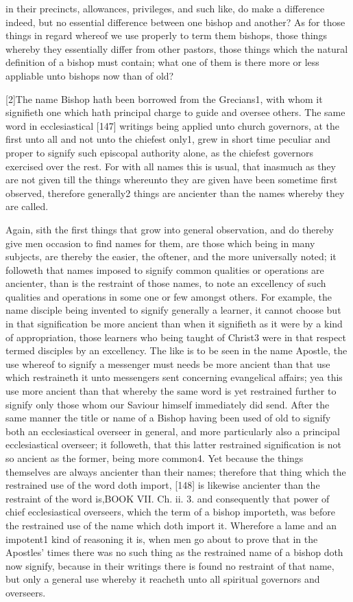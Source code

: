 in their precincts, allowances, privileges, and such like, do make a difference indeed, but no essential difference between one bishop and another? As for those things in regard whereof we use properly to term them bishops, those things whereby they essentially differ from other pastors, those things which the natural definition of a bishop must contain; what one of them is there more or less appliable unto bishops now than of old?

[2]The name Bishop hath been borrowed from the Grecians1, with whom it signifieth one which hath principal charge to guide and oversee others. The same word in ecclesiastical [147] writings being applied unto church governors, at the first unto all and not unto the chiefest only1, grew in short time peculiar and proper to signify such episcopal authority alone, as the chiefest governors exercised over the rest. For with all names this is usual, that inasmuch as they are not given till the things whereunto they are given have been sometime first observed, therefore generally2 things are ancienter than the names whereby they are called.

Again, sith the first things that grow into general observation, and do thereby give men occasion to find names for them, are those which being in many subjects, are thereby the easier, the oftener, and the more universally noted; it followeth that names imposed to signify common qualities or operations are ancienter, than is the restraint of those names, to note an excellency of such qualities and operations in some one or few amongst others. For example, the name disciple being invented to signify generally a learner, it cannot choose but in that signification be more ancient than when it signifieth as it were by a kind of appropriation, those learners who being taught of Christ3 were in that respect termed disciples by an excellency. The like is to be seen in the name Apostle, the use whereof to signify a messenger must needs be more ancient than that use which restraineth it unto messengers sent concerning evangelical affairs; yea this use more ancient than that whereby the same word is yet restrained further to signify only those whom our Saviour himself immediately did send. After the same manner the title or name of a Bishop having been used of old to signify both an ecclesiastical overseer in general, and more particularly also a principal ecclesiastical overseer; it followeth, that this latter restrained signification is not so ancient as the former, being more common4. Yet because the things themselves are always ancienter than their names; therefore that thing which the restrained use of the word doth import, [148] is likewise ancienter than the restraint of the word is,BOOK VII. Ch. ii. 3. and consequently that power of chief ecclesiastical overseers, which the term of a bishop importeth, was before the restrained use of the name which doth import it. Wherefore a lame and an impotent1 kind of reasoning it is, when men go about to prove that in the Apostles’ times there was no such thing as the restrained name of a bishop doth now signify, because in their writings there is found no restraint of that name, but only a general use whereby it reacheth unto all spiritual governors and overseers.

